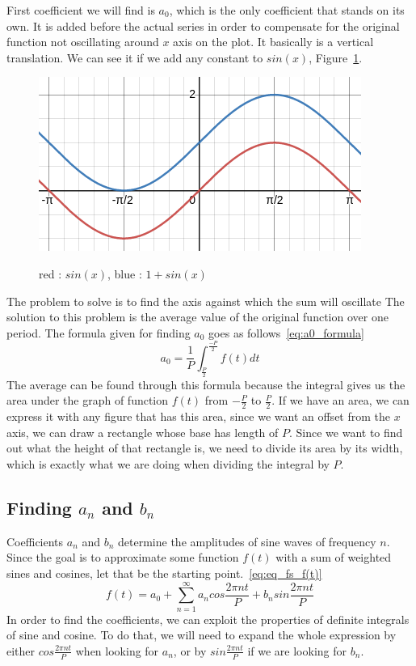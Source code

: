 \documentclass[titlepage]{article}
\begin{document}
    First coefficient we will find is $a_0$, which is the only coefficient that 
    stands on its own. It is added before the actual series in order to compensate
    for the original function not oscillating around $x$ axis on the plot. It 
    basically is a vertical translation. We can see it if we add any constant
    to $sin(x)$, Figure~\ref{fig:sine_translation}.
    \begin{figure}[H]
        \caption{red : $sin(x)$, blue : $1 + sin(x)$}
        \centering
        \includegraphics[width=0.5\linewidth]{translated_vanilla_sinewave}
        \label{fig:sine_translation}
    \end{figure}
    The problem to solve is to find the axis against which the sum will oscillate
    The solution to this problem is the average
    value of the original function over one period. The formula given for finding
    $a_0$ goes as follows~\eqref{eq:a0_formula}
    \begin{equation}\label{eq:a0_formula}
        a_0 = \frac{1}{P}\int_{\frac{P}{2}}^{\frac{-P}{2}}f(t)dt
    \end{equation}
    The average can be found through this formula because the 
    integral gives us the area under the graph of function $f(t)$ from 
    $-\frac{P}{2}$ to $\frac{P}{2}$. If we have an area, we can express it with 
    any figure that has this area, since we want an offset from the $x$ axis, 
    we can draw a rectangle whose base has length of $P$. Since we want to find
    out what the height of that rectangle is, we need to divide its area by its
    width, which is exactly what we are doing when dividing the integral by $P$.

\subsection{Finding $a_n$ and $b_n$}

    Coefficients $a_n$ and $b_n$ determine the amplitudes of sine waves of frequency
    $n$. Since the goal is to approximate some function $f(t)$ with a sum of 
    weighted sines and cosines, let that be the starting point.~\eqref{eq:eq_fs_f(t)}
    \begin{equation} \label{eq:eq_fs_f(t)}
        f(t) = a_0 + \sum_{n=1}^{\infty}a_ncos\frac{2\pi nt}{P} + b_n%
            sin\frac{2\pi nt}{P}
    \end{equation}
    In order to find the coefficients, we can exploit the properties of definite
    integrals of sine and cosine. To do that, we will need to expand the whole 
    expression by either $cos\frac{2\pi nt}{P}$ when looking for $a_n$, or by 
    $sin\frac{2\pi nt}{P}$ if we are looking for $b_n$. 
\end{document}
